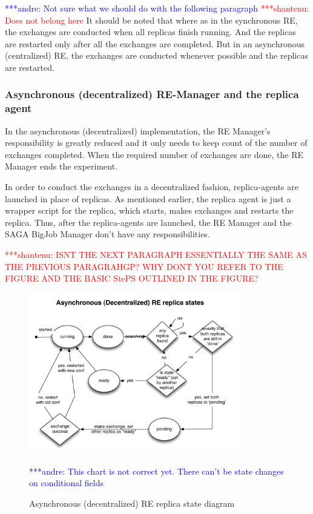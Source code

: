 \documentclass{rspublic}
\newcommand{\jhanote}[1]{ {\textcolor{red} { ***shantenu: #1 }}}
\newcommand{\alnote}[1]{ {\textcolor{blue} { ***andre: #1 }}}
\newcommand{\alnote}[1]{}
\newcommand{\jhanote}[1]{}
\begin{document}
\alnote{Not sure what we should do with the following paragraph}
\jhanote{Does not belong here} It should be noted that where as in the
synchronous RE, the exchanges are conducted when all replicas finish
running. And the replicas are restarted only after all the exchanges
are completed. But in an asynchronous (centralized) RE, the exchanges
are conducted whenever possible and the replicas are restarted.

\subsubsection{Asynchronous (decentralized) RE-Manager and the replica agent}

In the asynchronous (decentralized) implementation, the RE Manager's responsibility is greatly reduced and it only needs to keep count of the number of exchanges completed. When the required number of exchanges are done, the RE Manager ends the experiment. 

In order to conduct the exchanges in a decentralized fashion, replica-agents are launched in place of replicas. As mentioned earlier, the replica agent is just a wrapper script for the replica, which starts, makes exchanges and restarts the replica. Thus, after the replica-agents are launched, the RE Manager and the SAGA BigJob Manager don't have any responsibilities.  

\jhanote{ISNT THE NEXT PARAGRAPH ESSENTIALLY THE SAME AS THE PREVIOUS
  PARAGRAHGP? WHY DONT YOU REFER TO THE FIGURE AND THE BASIC StePS
  OUTLINED IN THE FIGURE?}
  
\begin{figure}[t]
      \centering
          \includegraphics[width=0.82\textwidth]{../figures/decent_state.pdf}
          \caption{\footnotesize Asynchronous (decentralized) RE replica state diagram
              } \alnote{This chart is not correct yet. There can't be state changes on conditional fields}
      \label{fig:state}
\end{figure}
\end{document}
